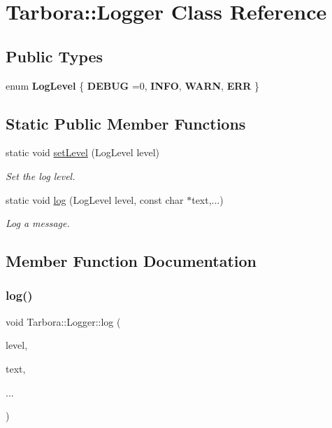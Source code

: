 \hypertarget{classTarbora_1_1Logger}{}\section{Tarbora\+:\+:Logger Class Reference}
\label{classTarbora_1_1Logger}
\subsection*{Public Types}
\begin{DoxyCompactItemize}
\item 
\mbox{\label{classTarbora_1_1Logger_a0596faea258f2da51ad7ca3abd806be3}} 
enum {\bfseries Log\+Level} \{ {\bfseries D\+E\+B\+UG} =0, 
{\bfseries I\+N\+FO}, 
{\bfseries W\+A\+RN}, 
{\bfseries E\+RR}
 \}
\end{DoxyCompactItemize}
\subsection*{Static Public Member Functions}
\begin{DoxyCompactItemize}
\item 
static void \hyperlink{classTarbora_1_1Logger_a2641541068ea40f58ae52defcad4caea}{set\+Level} (Log\+Level level)
\begin{DoxyCompactList}\small\item\em Set the log level. \end{DoxyCompactList}\item 
static void \hyperlink{classTarbora_1_1Logger_a4a6b2478d42d5d6985c4683022531de0}{log} (Log\+Level level, const char $\ast$text,...)
\begin{DoxyCompactList}\small\item\em Log a message. \end{DoxyCompactList}\end{DoxyCompactItemize}


\subsection{Member Function Documentation}
\mbox{\label{classTarbora_1_1Logger_a4a6b2478d42d5d6985c4683022531de0}} 
\subsubsection{\texorpdfstring{log()}{log()}}
{\footnotesize\ttfamily void Tarbora\+::\+Logger\+::log (\begin{DoxyParamCaption}\item[{Log\+Level}]{level,  }\item[{const char $\ast$}]{text,  }\item[{}]{... }\end{DoxyParamCaption})\hspace{0.3cm}{\ttfamily [static]}}



